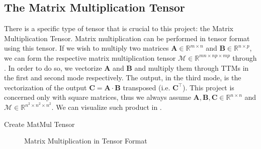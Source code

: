 \subsection{The Matrix Multiplication Tensor} \label{sec:The Matrix Multiplication Tensor}

    There is a specific type of tensor that is crucial to this project: the
    Matrix Multiplication Tensor. Matrix multiplication can be performed in
    tensor format using this tensor. If we wish to multiply two matrices
    $\mathbf{A} \in \mathbb{R}^{m\times n}$ and $\mathbf{B}\in
    \mathbb{R}^{n\times p}$, we can form the respective matrix multiplication
    tensor $\mathcal{M}\in \mathbb{R}^{mn \times np\times mp}$ through
    . In order to do so, we vectorize $\mathbf{A}$ and
    $\mathbf{B}$ and multiply them through TTMs in the first and second mode
    respectively. The output, in the third mode, is the vectorization of the
    output $\mathbf{C} = \mathbf{A}\cdot \mathbf{B}$ transposed (i.e.
    $\mathbf{C^\intercal}$). This project is concerned only with square
    matrices, thus we always assume $\mathbf{A}, \mathbf{B}, \mathbf{C}\in
    \mathbb{R}^{n\times n}$ and $\mathcal{M}\in\mathbb{R}^{n^2\times n^2\times
    n^2}$. We can visualize such product in . 

    \begin{algorithm}
        \caption{Create MatMul Tensor}
        \label{alg:matmul_tensor}
        \begin{algorithmic}[0]
                 
                        \EndFor
                    \EndFor
                \EndFor
            \EndFunction
        \end{algorithmic}
    \end{algorithm}

    \begin{figure}
        \centering
        
        \caption{Matrix Multiplication in Tensor Format}
        \label{fig:matmul_tensor}
    \end{figure}

